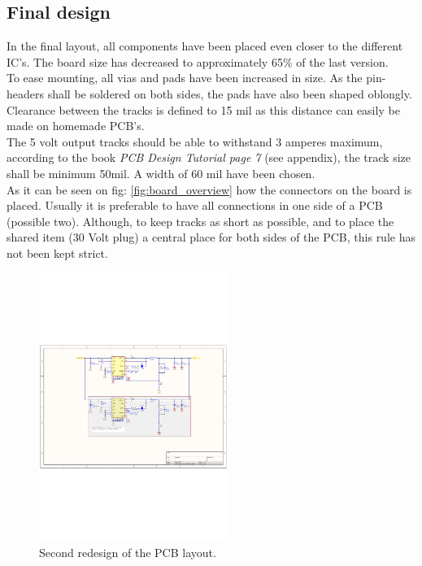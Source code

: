 \subsection{Final design}
In the final layout, all components have been placed even closer to the different IC's. The board size has decreased to approximately 65\% of the last version. 
\\ To ease mounting, all vias and pads have been increased in size. As the pin-headers shall be soldered on both sides, the pads have also been shaped oblongly. Clearance between the tracks is defined to 15 mil as this distance can easily be made on homemade PCB's. 
\\ The 5 volt output tracks should be able to withstand 3 amperes maximum, according to the book \textit{PCB Design Tutorial page 7} (see appendix), the track size shall be minimum 50mil. A width of 60 mil have been chosen. 
\\ As it can be seen on fig: \ref{fig:board_overview} how the connectors on the board is placed. Usually it is preferable to have all connections in one side of a PCB (possible two). Although, to keep tracks as short as possible, and to place the shared item (30 Volt plug) a central place for both sides of the PCB, this rule has not been kept strict.



\begin{figure}[H]
	\begin{centering}
		 \includegraphics[width=0.55\textwidth,page=3,angle=0]{images/SIG60_v0_4}
		\caption{Second redesign of the PCB layout.}
	\end{centering}
\end{figure}


